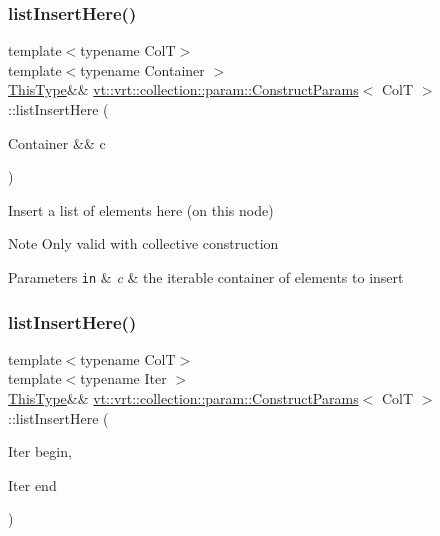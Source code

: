 \subsubsection{\texorpdfstring{list\+Insert\+Here()}{listInsertHere()}\hspace{0.1cm}{\footnotesize\ttfamily [1/2]}}
{\footnotesize\ttfamily template$<$typename ColT$>$ \\
template$<$typename Container $>$ \\
\hyperlink{structvt_1_1vrt_1_1collection_1_1param_1_1_construct_params_a13d4910c0f6825c7b0ddfebce5288bea}{This\+Type}\&\& \hyperlink{structvt_1_1vrt_1_1collection_1_1param_1_1_construct_params}{vt\+::vrt\+::collection\+::param\+::\+Construct\+Params}$<$ ColT $>$\+::list\+Insert\+Here (\begin{DoxyParamCaption}\item[{Container \&\&}]{c }\end{DoxyParamCaption})\hspace{0.3cm}{\ttfamily [inline]}}



Insert a list of elements here (on this node) 

\begin{DoxyNote}{Note}
Only valid with collective construction
\end{DoxyNote}

\begin{DoxyParams}[1]{Parameters}
\mbox{\tt in}  & {\em c} & the iterable container of elements to insert \\
\hline
\end{DoxyParams}
\mbox{\label{structvt_1_1vrt_1_1collection_1_1param_1_1_construct_params_a76b651b37044ec8602f04ac97c90035b}} 
\subsubsection{\texorpdfstring{list\+Insert\+Here()}{listInsertHere()}\hspace{0.1cm}{\footnotesize\ttfamily [2/2]}}
{\footnotesize\ttfamily template$<$typename ColT$>$ \\
template$<$typename Iter $>$ \\
\hyperlink{structvt_1_1vrt_1_1collection_1_1param_1_1_construct_params_a13d4910c0f6825c7b0ddfebce5288bea}{This\+Type}\&\& \hyperlink{structvt_1_1vrt_1_1collection_1_1param_1_1_construct_params}{vt\+::vrt\+::collection\+::param\+::\+Construct\+Params}$<$ ColT $>$\+::list\+Insert\+Here (\begin{DoxyParamCaption}\item[{Iter}]{begin,  }\item[{Iter}]{end }\end{DoxyParamCaption})\hspace{0.3cm}{\ttfamily [inline]}}



